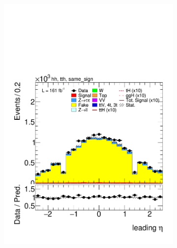 \begin{figure}[htbp]
\begin{subfigure}[b]{0.45\textwidth}
      \includegraphics[width=\textwidth]{images/fakes_run3/plot_tau_0_eta_hh_tth_22_23_24_same_sign.pdf}
      \caption{}
    \end{subfigure}


\end{figure}
